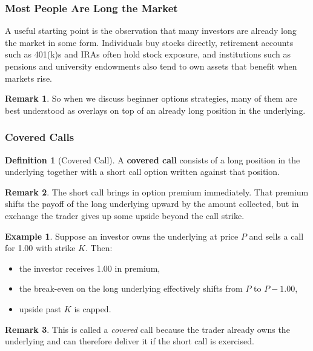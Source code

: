 \documentclass[11pt]{article}
\theoremstyle{definition}
\newtheorem{definition}{Definition}[section]
\newtheorem{example}{Example}[section]
\newtheorem{remark}{Remark}[section]
\begin{document}
\subsubsection{Most People Are Long the Market}

A useful starting point is the observation that many investors are already long the market in some form. Individuals buy stocks directly, retirement accounts such as 401(k)s and IRAs often hold stock exposure, and institutions such as pensions and university endowments also tend to own assets that benefit when markets rise.

\begin{remark}
So when we discuss beginner options strategies, many of them are best understood as overlays on top of an already long position in the underlying.
\end{remark}

\subsubsection{Covered Calls}

\begin{definition}[Covered Call]
A \textbf{covered call} consists of a long position in the underlying together with a short call option written against that position.
\end{definition}

\begin{remark}
The short call brings in option premium immediately. That premium shifts the payoff of the long underlying upward by the amount collected, but in exchange the trader gives up some upside beyond the call strike.
\end{remark}

\begin{example}
Suppose an investor owns the underlying at price \(P\) and sells a call for 1.00 with strike \(K\). Then:
\begin{itemize}[leftmargin=2em]
    \item the investor receives 1.00 in premium,
    \item the break-even on the long underlying effectively shifts from \(P\) to \(P-1.00\),
    \item upside past \(K\) is capped.
\end{itemize}
\end{example}

\begin{remark}
This is called a \emph{covered} call because the trader already owns the underlying and can therefore deliver it if the short call is exercised.
\end{remark}
\end{document}
